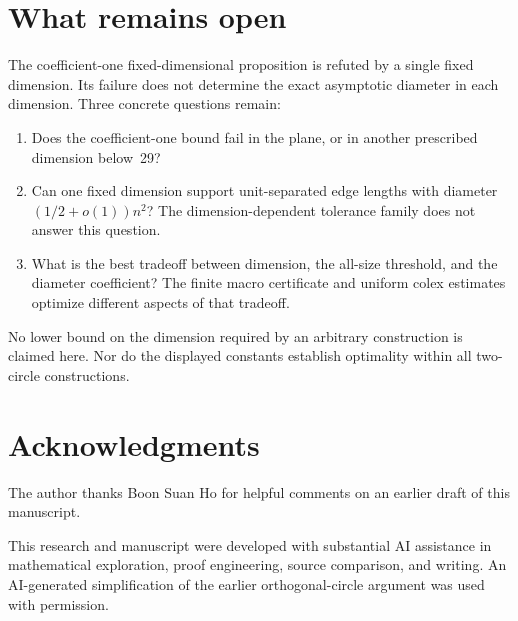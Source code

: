\section{What remains open}\label{sec:open}

The coefficient-one fixed-dimensional proposition is refuted by a single
fixed dimension. Its failure does not determine the exact asymptotic
diameter in each dimension. Three concrete questions remain:
\begin{enumerate}[leftmargin=1.7em,itemsep=4pt]
\item Does the coefficient-one bound fail in the plane, or in another
 prescribed dimension below~29?
\item Can one fixed dimension support unit-separated edge lengths
 with diameter $(1/2+o(1))n^2$? The dimension-dependent tolerance family does
 not answer this question.
\item What is the best tradeoff between dimension, the all-size threshold,
 and the diameter coefficient? The finite macro certificate and uniform
 colex estimates optimize different aspects of that tradeoff.
\end{enumerate}
No lower bound on the dimension required by an arbitrary construction is
claimed here. Nor do the displayed constants establish optimality within
all two-circle constructions.

\section*{Acknowledgments}
The author thanks Boon Suan Ho for helpful comments on an earlier draft of this manuscript.

This research and manuscript were developed with substantial AI assistance
in mathematical exploration, proof engineering, source comparison, and
writing. An AI-generated simplification of the earlier orthogonal-circle
argument was used with permission.

